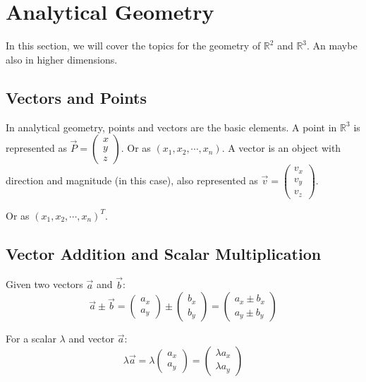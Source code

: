 \newpage
\section{Analytical Geometry}

In this section, we will cover the topics for the geometry of \(\mathbb{R}^2\) and \(\mathbb{R}^3\).
An maybe also in higher dimensions.

\subsection{Vectors and Points}
In analytical geometry, points and vectors are the basic elements.
\newline
A point in \(\mathbb{R}^3\) is represented as \(\vec{P} = \begin{pmatrix} x \\ y \\ z \end{pmatrix}\).
Or as \((x_1, x_2, \cdots , x_n)\).
\newline
A vector is an object with direction and magnitude (in this case), also represented as \(\vec{v} = \begin{pmatrix} v_x \\ v_y \\ v_z \end{pmatrix}\).

Or as \((x_1, x_2, \cdots , x_n)^{T}\).

\subsection{Vector Addition and Scalar Multiplication}
Given two vectors \(\vec{a}\) and \(\vec{b}\):
\[
	\vec{a} \pm  \vec{b} = \begin{pmatrix} a_x \\ a_y \end{pmatrix} \pm \begin{pmatrix} b_x \\ b_y \end{pmatrix} = \begin{pmatrix} a_x \pm b_x \\ a_y \pm b_y \end{pmatrix}
\]

For a scalar \(\lambda\) and vector \(\vec{a}\):
\[
	\lambda \vec{a} = \lambda \begin{pmatrix} a_x \\ a_y \end{pmatrix} = \begin{pmatrix} \lambda a_x \\ \lambda a_y \end{pmatrix}
\]

